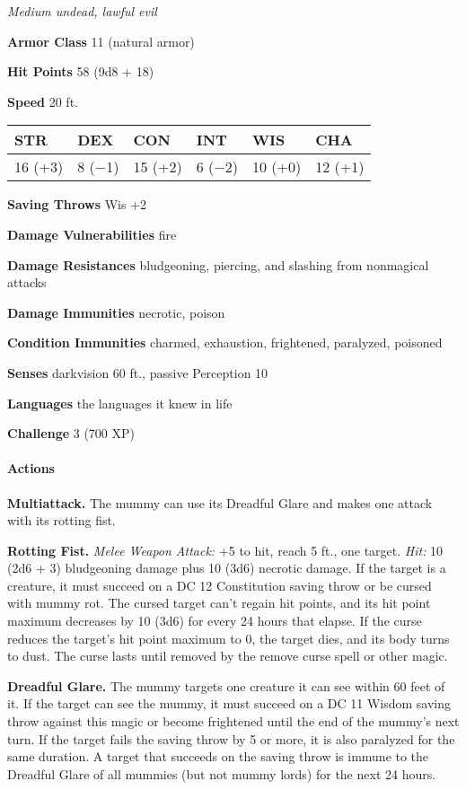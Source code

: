 \documentclass[
]{article}
\begin{document}
\emph{Medium undead, lawful evil}

\textbf{Armor Class} 11 (natural armor)

\textbf{Hit Points} 58 (9d8 + 18)

\textbf{Speed} 20 ft.

\begin{longtable}[]{@{}llllll@{}}
\toprule
STR & DEX & CON & INT & WIS & CHA\tabularnewline
\midrule
\endhead
16 (+3) & 8 (−1) & 15 (+2) & 6 (−2) & 10 (+0) & 12 (+1)\tabularnewline
\bottomrule
\end{longtable}

\textbf{Saving Throws} Wis +2

\textbf{Damage Vulnerabilities} fire

\textbf{Damage Resistances} bludgeoning, piercing, and slashing from
nonmagical attacks

\textbf{Damage Immunities} necrotic, poison

\textbf{Condition Immunities} charmed, exhaustion, frightened,
paralyzed, poisoned

\textbf{Senses} darkvision 60 ft., passive Perception 10

\textbf{Languages} the languages it knew in life

\textbf{Challenge} 3 (700 XP)

\hypertarget{actions-11}{%
\paragraph{Actions}\label{actions-11}}

\textbf{Multiattack.} The mummy can use its Dreadful Glare and makes one
attack with its rotting fist.

\textbf{Rotting Fist.} \emph{Melee Weapon Attack:} +5 to hit, reach 5
ft., one target. \emph{Hit:} 10 (2d6 + 3) bludgeoning damage plus 10
(3d6) necrotic damage. If the target is a creature, it must succeed on a
DC 12 Constitution saving throw or be cursed with mummy rot. The cursed
target can't regain hit points, and its hit point maximum decreases by
10 (3d6) for every 24 hours that elapse. If the curse reduces the
target's hit point maximum to 0, the target dies, and its body turns to
dust. The curse lasts until removed by the remove curse spell or other
magic.

\textbf{Dreadful Glare.} The mummy targets one creature it can see
within 60 feet of it. If the target can see the mummy, it must succeed
on a DC 11 Wisdom saving throw against this magic or become frightened
until the end of the mummy's next turn. If the target fails the saving
throw by 5 or more, it is also paralyzed for the same duration. A target
that succeeds on the saving throw is immune to the Dreadful Glare of all
mummies (but not mummy lords) for the next 24 hours.
\end{document}
